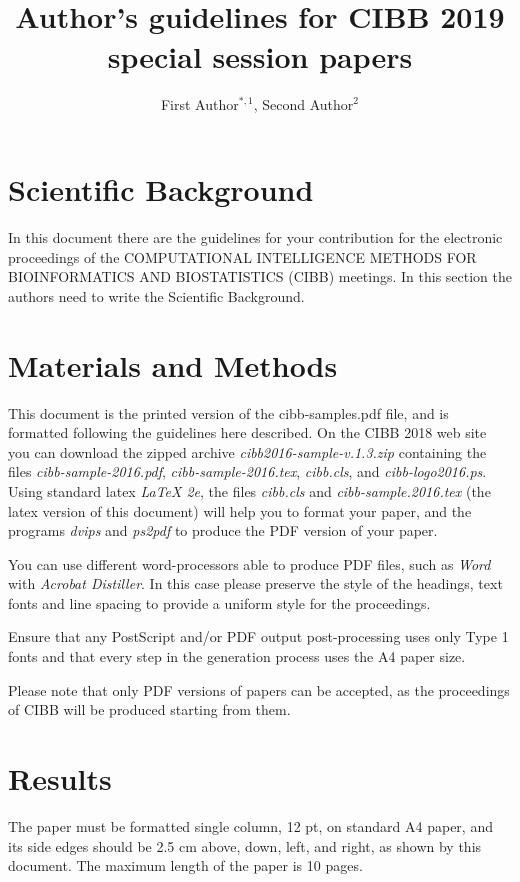 \documentclass[12pt,a4paper]{cibb}
\title{\large $\ $\\ \bf Author's guidelines for CIBB 2019 special session 
papers}
\author{ First Author$^{*,1}$, Second Author$^{2}$}
\begin{document}
\thispagestyle{myheadings}
\pagestyle{myheadings}



\section{\bf Scientific Background}

In  this   document  there  are  the  guidelines   for  your  contribution
for the electronic proceedings of the COMPUTATIONAL INTELLIGENCE METHODS
FOR BIOINFORMATICS AND BIOSTATISTICS (CIBB) meetings. In this section the authors need to write the Scientific Background.


\section{\bf Materials and Methods}

This document is  the printed version of the cibb-samples.pdf file, and
is formatted following the guidelines here described. On the CIBB 2018 web site
 you can download the  zipped
archive {\it cibb2016-sample-v.1.3.zip} containing the files  {\it cibb-sample-2016.pdf}, {\it cibb-sample-2016.tex},
{\it cibb.cls}, and {\it cibb-logo2016.ps}.
Using standard  latex  {\it LaTeX 2e}, the files
 {\it cibb.cls} and {\it cibb-sample.2016.tex}
(the  latex version  of this document) will help you to format your paper, and the
programs {\it dvips} and {\it  ps2pdf} to produce the PDF version of your paper.

You can  use different word-processors  able to produce  PDF files,
such  as {\it Word} with {\it Acrobat Distiller}.  In  this  case please  preserve the  style of  the
headings, text fonts  and line spacing to provide  a uniform style for
the proceedings.

Ensure that any PostScript and/or PDF output post-processing
 uses only Type 1 fonts and that every step in the generation
 process uses the A4 paper size.


Please note that only PDF versions of papers can be accepted, as the
proceedings of CIBB will be produced starting  from them.



\section{\bf Results}

The paper  must be formatted  single column, 12 pt,  on standard A4
paper, and its side edges should be 2.5 cm above, down, left, and right,
as shown by this document. The maximum length of  the paper is 10 pages.
\end{document}
